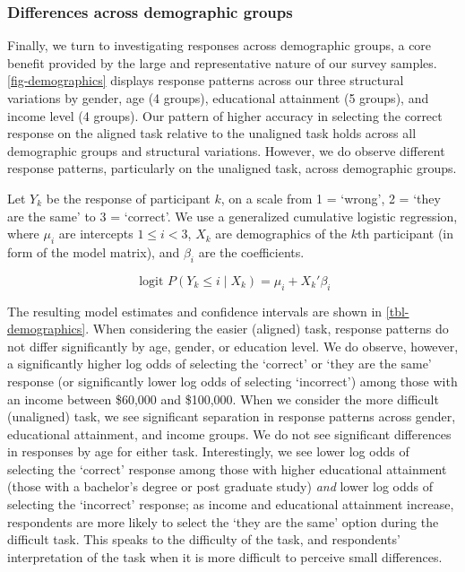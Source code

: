 \documentclass[
]{jds}
\begin{document}
\hypertarget{differences-across-demographic-groups}{%
\subsubsection{Differences across demographic
groups}\label{differences-across-demographic-groups}}

Finally, we turn to investigating responses across demographic groups, a
core benefit provided by the large and representative nature of our
survey samples. \autoref{fig-demographics} displays response patterns
across our three structural variations by gender, age (4 groups),
educational attainment (5 groups), and income level (4 groups). Our
pattern of higher accuracy in selecting the correct response on the
aligned task relative to the unaligned task holds across all demographic
groups and structural variations. However, we do observe different
response patterns, particularly on the unaligned task, across
demographic groups.

Let \(Y_k\) be the response of participant \(k\), on a scale from 1 =
`wrong', 2 = `they are the same' to 3 = `correct'. We use a generalized
cumulative logistic regression, where \(\mu_i\) are intercepts
\(1 \le i < 3\), \(X_k\) are demographics of the \(k\)th participant (in
form of the model matrix), and \(\beta_{i}\) are the coefficients.

\[
\text{ logit } P(Y_k \le i \mid X_k) = \mu_i + X_{k}'\beta_{i}
\]

The resulting model estimates and confidence intervals are shown in
\autoref{tbl-demographics}. When considering the easier (aligned) task,
response patterns do not differ significantly by age, gender, or
education level. We do observe, however, a significantly higher log odds
of selecting the `correct' or `they are the same' response (or
significantly lower log odds of selecting `incorrect') among those with
an income between \$60,000 and \$100,000. When we consider the more
difficult (unaligned) task, we see significant separation in response
patterns across gender, educational attainment, and income groups. We do
not see significant differences in responses by age for either task.
Interestingly, we see lower log odds of selecting the `correct' response
among those with higher educational attainment (those with a bachelor's
degree or post graduate study) \emph{and} lower log odds of selecting
the `incorrect' response; as income and educational attainment increase,
respondents are more likely to select the `they are the same' option
during the difficult task. This speaks to the difficulty of the task,
and respondents' interpretation of the task when it is more difficult to
perceive small differences.
\end{document}
